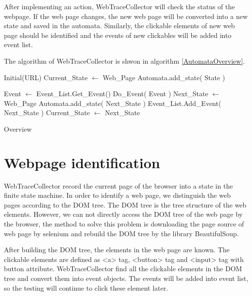 After implementing an action, WebTraceCollector will check the status of the webpage.
If the web page changes, the new web page will be converted into a new state and saved in the automata.
Similarly, the clickable elements of new web page should be identified and 
the events of new clickables will be added into event list.

The algorithm of WebTraceCollector is shwon in algorithm \ref{AutomataOverview}.

\begin{algorithm}[htb]
	\begin{doublespace}		
		Initial(URL)\;
		Current\_State $\gets$ Web\_Page\;
		Automata.add\_state( State )\;
				
		{
			Event $\gets$ Event\_List.Get\_Event()\;
			Do\_Event( Event )\;
			Next\_State $\gets$ Web\_Page\;
			{
				Automata.add\_state( Next\_State )\;
				Event\_List.Add\_Event( Next\_State )\;
			}
			Current\_State $\gets$ Next\_State\;
		}		
	\end{doublespace}
	\caption{Overview}
	\label{algorithm:overview}
\end{algorithm} 


\clearpage

\section{Webpage identification}

WebTraceCollector record the current page of the browser into a state in the finite state machine.
In order to identify a web page,
we distinguish the web pages according to the DOM tree.
The DOM tree is the tree structure of the web elements.
However, we can not directly access the DOM tree of the web page by the browser,
the method to solve this problem is downloading the page source of web page by selenium 
and rebuild the DOM tree by the library BeautifulSoup\cite{BS4}.

After building the DOM tree, the elements in the web page are known.
The clickable elements are defined as <a> tag, <button> tag and <input> tag with button attribute. 
WebTraceCollector find all the clickable elements in the DOM tree
and convert them into event objects.
The events will be added into event list,
so the testing will continue to click these element later.

